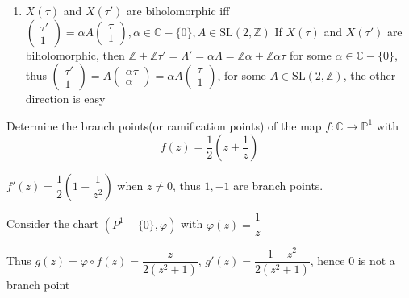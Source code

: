 \documentclass[main]{subfiles}
\begin{document}
\begin{solution}
\begin{enumerate}[label=\textbf{\arabic*.}, leftmargin=*]
\item $X(\tau)$ and $X(\tau')$ are biholomorphic iff $\begin{pmatrix}
\tau'\\ 
1
\end{pmatrix}
=\alpha A
\begin{pmatrix}
\tau\\ 
1
\end{pmatrix}, \alpha\in \mathbb{C}-\{0\}, A\in \mathrm{SL}(2,\mathbb{Z})$
If $X(\tau)$ and $X(\tau')$ are biholomorphic, then $\mathbb{Z}+\mathbb{Z}\tau'=\Lambda'=\alpha\Lambda=\mathbb{Z}\alpha+\mathbb{Z}\alpha\tau$ for some $\alpha\in \mathbb{C}-\{0\}$, thus $\begin{pmatrix}
\tau'\\ 
1
\end{pmatrix}
=
A
\begin{pmatrix}
\alpha\tau\\ 
\alpha
\end{pmatrix}
=\alpha A
\begin{pmatrix}
\tau\\ 
1
\end{pmatrix}$, for some $A\in \mathrm{SL}(2,\mathbb{Z})$, the other direction is easy
\end{enumerate}
\end{solution}

\begin{exercise}
Determine the branch points(or ramification points) of the map $f:\mathbb C\to\mathbb P^1$ with
\[f(z)=\frac{1}{2}\left(z+\frac{1}{z}\right)\]
\end{exercise}

\begin{solution}
$f'(z)=\dfrac{1}{2}\left(1-\dfrac{1}{z^{2}}\right)$ when $z\neq0$, thus $1,-1$ are branch points. \par
Consider the chart $({P}^{1}-\{0\},\varphi)$ with $\varphi(z)=\dfrac{1}{z}$

\begin{center}
\end{center}

Thus $g(z)=\varphi\circ f(z)=\dfrac{z}{2(z^{2}+1)}$, $g'(z)=\dfrac{1-z^{2}}{2(z^{2}+1)}$, hence \(0\) is not a branch point
\end{solution}
\end{document}
